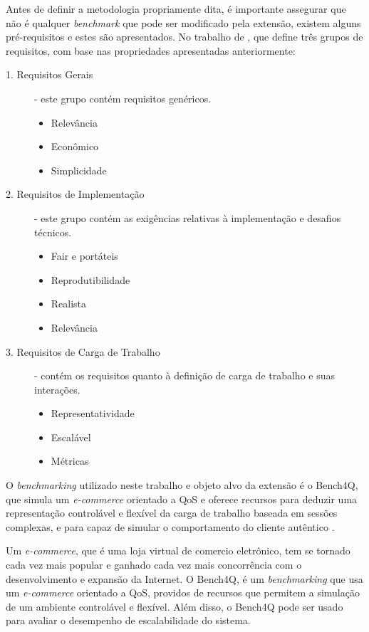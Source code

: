 Antes de definir a metodologia propriamente dita, é importante assegurar que não é qualquer \textit{benchmark} que pode ser modificado pela extensão, existem alguns pré-requisitos e estes são apresentados. No trabalho de , que define três grupos de requisitos, com base nas propriedades apresentadas anteriormente:

\begin{description}
	\item[1. Requisitos Gerais] - este grupo contém requisitos genéricos. 
	\begin{itemize}
		\item Relevância
		\item Econômico
		\item Simplicidade
	\end{itemize}
	
	\item[2. Requisitos de Implementação] - este grupo contém as exigências relativas à implementação e desafios técnicos. \hfill 
	\begin{itemize}
		\item Fair e portáteis
		\item Reprodutibilidade
		\item Realista
		\item Relevância
	\end{itemize}
	
	\item[3. Requisitos de Carga de Trabalho ] - contém os requisitos quanto à definição de carga de trabalho e suas interações. \hfill 
	\begin{itemize}
		\item Representatividade
		\item Escalável
		\item Métricas
	\end{itemize}
	
\end{description}


O \textit{benchmarking} utilizado neste trabalho e objeto alvo da extensão é o Bench4Q, que simula um \textit{e-commerce} orientado a QoS e oferece recursos para deduzir uma representação controlável e flexível da carga de trabalho baseada em sessões complexas, e para capaz de simular o comportamento do cliente autêntico \cite{Bench4Q}.

Um \textit{e-commerce}, que é uma loja virtual de comercio eletrônico, tem se tornado cada vez mais popular e ganhado cada vez mais concorrência com o desenvolvimento e expansão da Internet. O Bench4Q, é um \textit{benchmarking} que usa um \textit{e-commerce} orientado a QoS, providos de recursos que permitem a simulação de um ambiente controlável e flexível. Além disso, o Bench4Q pode ser usado para avaliar o desempenho de escalabilidade do sistema.

